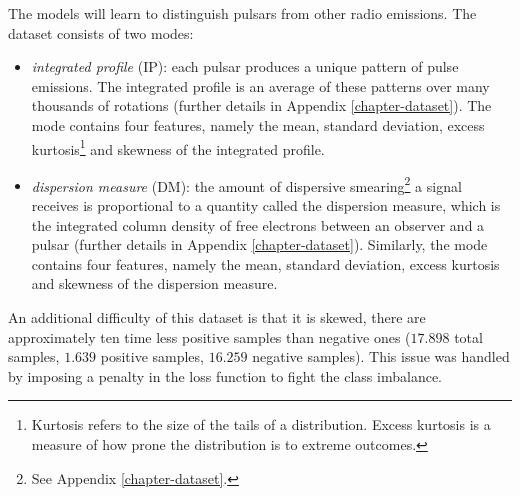The models will learn to distinguish pulsars from other radio emissions. The dataset consists of two modes:
\begin{itemize}
\item \textit{integrated profile} (IP): each pulsar produces a unique pattern of pulse emissions. The integrated profile is an average of these patterns over many thousands of rotations (further details in Appendix \ref{chapter-dataset}). The mode contains four features, namely the mean, standard deviation, excess kurtosis\footnote{Kurtosis refers to the size of the tails of a distribution. Excess kurtosis is a measure of how prone the distribution is to extreme outcomes.} and skewness of the integrated profile.
\item \textit{dispersion measure} (DM): the amount of dispersive smearing\footnote{See Appendix \ref{chapter-dataset}.} a signal receives is proportional to a quantity called the dispersion measure, which is the integrated column density of free electrons between an observer and a pulsar (further details in Appendix \ref{chapter-dataset}). Similarly, the mode contains four features, namely the mean, standard deviation, excess kurtosis and skewness of the dispersion measure.
\end{itemize}

An additional difficulty of this dataset is that it is skewed, there are approximately ten time less positive samples than negative ones ($17.898$ total samples, $1.639$ positive samples, $16.259$ negative samples). This issue was handled by imposing a penalty in the loss function to fight the class imbalance.

